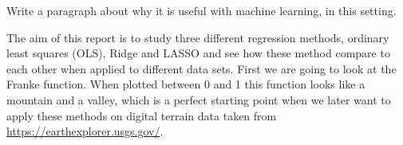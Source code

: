 \thispagestyle{plain}

Write a paragraph about why it is useful with machine learning, in this setting.

\noindent The aim of this report is to study three different regression methods, ordinary least squares (OLS), Ridge and LASSO and see how these method compare to each other when applied to different data sets. First we are going to look at the Franke function. When plotted between 0 and 1 this function looks like a mountain and a valley, which is a perfect starting point when we later want to apply these methods on digital terrain data taken from \url{https://earthexplorer.usgs.gov/}.

